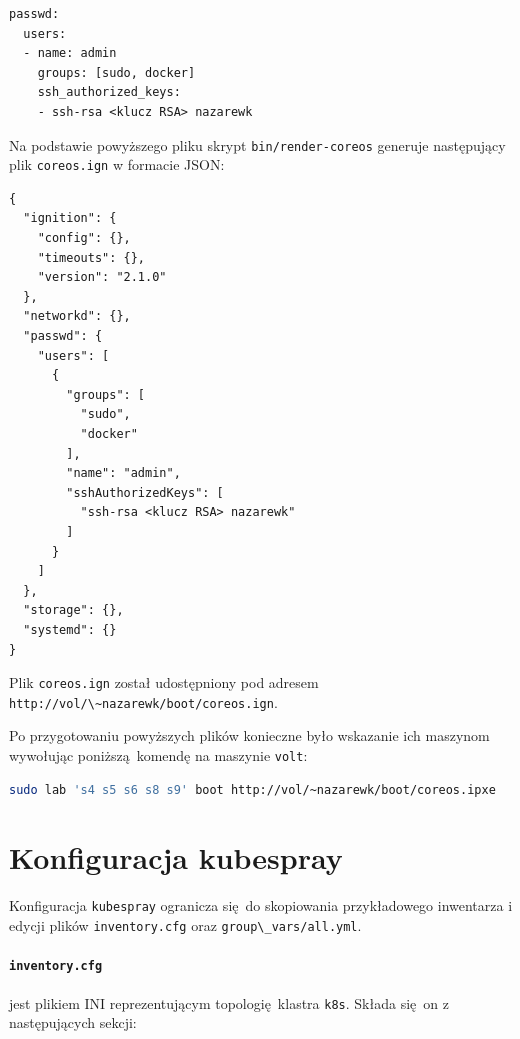 \documentclass[a4paper,12pt,twoside,openany]{report}
\newcommand{\passthrough}[1]{#1}
\begin{document}
\begin{lstlisting}
passwd:
  users:
  - name: admin
    groups: [sudo, docker]
    ssh_authorized_keys:
    - ssh-rsa <klucz RSA> nazarewk
\end{lstlisting}

Na podstawie powyższego pliku skrypt
\passthrough{\lstinline!bin/render-coreos!} generuje następujący plik
\passthrough{\lstinline!coreos.ign!} w formacie JSON:

\begin{lstlisting}
{
  "ignition": {
    "config": {},
    "timeouts": {},
    "version": "2.1.0"
  },
  "networkd": {},
  "passwd": {
    "users": [
      {
        "groups": [
          "sudo",
          "docker"
        ],
        "name": "admin",
        "sshAuthorizedKeys": [
          "ssh-rsa <klucz RSA> nazarewk"
        ]
      }
    ]
  },
  "storage": {},
  "systemd": {}
}
\end{lstlisting}

Plik \passthrough{\lstinline!coreos.ign!} został udostępniony pod
adresem \passthrough{\lstinline!http://vol/\~nazarewk/boot/coreos.ign!}.

Po przygotowaniu powyższych plików konieczne było wskazanie ich maszynom
wywołując poniższą~komendę na maszynie \passthrough{\lstinline!volt!}:

\begin{lstlisting}[language=bash]
sudo lab 's4 s5 s6 s8 s9' boot http://vol/~nazarewk/boot/coreos.ipxe 
\end{lstlisting}

\hypertarget{konfiguracja-kubespray}{%
\section{Konfiguracja kubespray}\label{konfiguracja-kubespray}}

Konfiguracja \passthrough{\lstinline!kubespray!} ogranicza się~do
skopiowania przykładowego inwentarza i edycji plików
\passthrough{\lstinline!inventory.cfg!} oraz
\passthrough{\lstinline!group\_vars/all.yml!}.

\hypertarget{inventory.cfg}{%
\paragraph{\texorpdfstring{\texttt{inventory.cfg}}{inventory.cfg}}\label{inventory.cfg}}

jest plikiem INI reprezentującym topologię~klastra
\passthrough{\lstinline!k8s!}. Składa się~on z następujących sekcji:
\end{document}
